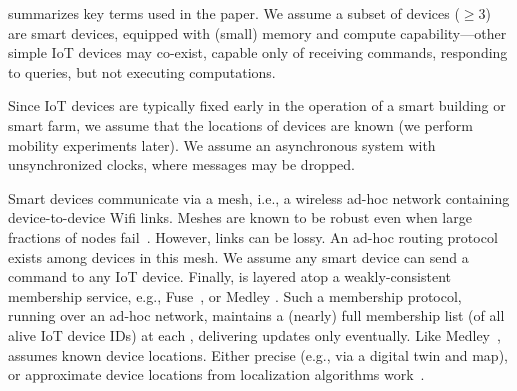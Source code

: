  summarizes key terms used in the paper. We assume a subset of devices ($\geq 3$) are smart devices, equipped 
with (small) memory and compute capability---other simple 
IoT devices may co-exist,
capable only of receiving commands, responding to queries, but not executing computations.

Since IoT devices are typically fixed early in the operation of a smart building or smart farm, 
we assume that the locations of devices are known (we perform mobility experiments later).
We assume an asynchronous system with unsynchronized clocks, where messages may be dropped.

Smart devices communicate via a mesh, i.e., a wireless ad-hoc network containing device-to-device Wifi links. Meshes are known to be robust even when large fractions of nodes fail~\cite{sengul2008adaptive}.
However, links can be lossy. An ad-hoc routing protocol \cite{olsrd}
exists among devices in this mesh.
We assume any smart device can send a command to any IoT device.  Finally, \sysname{} is layered atop a weakly-consistent membership service, e.g., Fuse~\cite{fuse}, or Medley \cite{medley}.  Such a membership protocol, running over an ad-hoc network,  maintains a (nearly) full membership list (of all alive IoT device IDs) at each \smart{}, delivering updates only eventually. Like Medley~\cite{medley}, \sysname{} assumes known device locations. Either precise (e.g., via a digital twin and map), or approximate device locations from localization algorithms work~\cite{han2013localization}.
